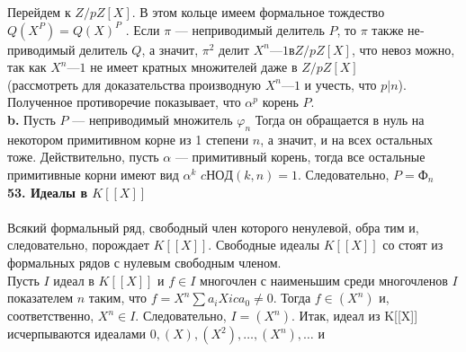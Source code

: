 Перейдем к $Z/pZ[X]$. В этом кольце имеем формальное тождество\linebreak
$Q(X^{P}) = Q(X)^{P}$ . Если $\pi$ --- неприводимый делитель $P$, то $\pi$ также не­\linebreak
приводимый делитель $Q$, а значит, $\pi^{2}$ делит $X^{n} — 1 в Z/pZ[X]$, что невоз­\linebreak
можно, так как $X^{n} — 1$ не имеет кратных множителей даже в $Z/pZ[X]$\\
\newpage
\noindent (рассмотреть для доказательства производную $X^{n} — 1$ и учесть, \linebreak
что $p|n$). Полученное противоречие показывает, что $\alpha^{p}$ корень $P$.\\
\hspace*{15pt}\textbf{b.} Пусть $P$ — неприводимый множитель $\varphi_n$ Тогда он обращается\linebreak
в нуль на некотором примитивном корне из 1 степени $n$, а значит, и на\linebreak
всех остальных тоже. Действительно, пусть $\alpha$ — примитивный корень,\linebreak
тогда все остальные примитивные корни имеют вид $\alpha^{k}$ $c НОД(k, n) = 1$.\linebreak
Следовательно, $P = \text{Ф}_n$\newline
\\
\noindent\textbf{53. Идеалы в $K[[X]]$}\\
\\
\hspace*{15pt}Всякий формальный ряд, свободный член которого ненулевой, обра­\linebreak
тим и, следовательно, порождает $K[[X]]$. Свободные идеалы $K[[X]]$ со­\linebreak
стоят из формальных рядов с нулевым свободным членом.\\
\hspace*{0pt} Пусть $I$ идеал в $K[[X]]$ и $f \in I$ многочлен с наименьшим среди\linebreak
многочленов $I$ показателем $n$ таким, что $f = X^{n}\sum a_{i}X{i} c a_0 \neq 0$. Тогда\linebreak
$f \in (X^{n})$ и, соответственно, $X^{n} \in I$. Следовательно, $I = (X^{n}).$ Итак,\linebreak
идеал из K[[X]] исчерпываются идеалами ${0}, (X), (X^{2}),\ldots, (X^{n} ), \ldots$ и\linebreak
